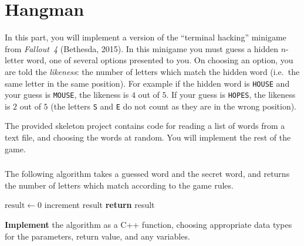 \clearpage
\part{Hangman}

In this part, you will implement a version of the ``terminal hacking'' minigame from \emph{Fallout~4} (Bethesda, 2015).
In this minigame you must guess a hidden $n$-letter word, one of several options presented to you.
On choosing an option, you are told the \emph{likeness}: the number of letters which match the hidden word (i.e.\ the same letter in the same position).
For example if the hidden word is \texttt{HOUSE} and your guess is \texttt{MOUSE}, the likeness is $4$ out of $5$.
If your guess is \texttt{HOPES}, the likeness is $2$ out of $5$ (the letters \texttt{S} and \texttt{E} do not count as they are in the wrong position).

The provided skeleton project contains code for reading a list of words from a text file, and choosing the words at random.
You will implement the rest of the game.

\section{} \label{core-a-first}

The following algorithm takes a guessed word and the secret word, and returns the number of letters which match according to the game rules.

\begin{algorithm}
\begin{algorithmic}
        \State $\text{result} \gets 0$
                \State increment result
            \EndIf
        \EndFor
        \State \textbf{return} result
    \EndProcedure
\end{algorithmic}
\end{algorithm}

\textbf{Implement} the algorithm as a C++ function, choosing appropriate data types for the parameters, return value, and any variables.

\section{}



\section{} \label{core-a-last}

